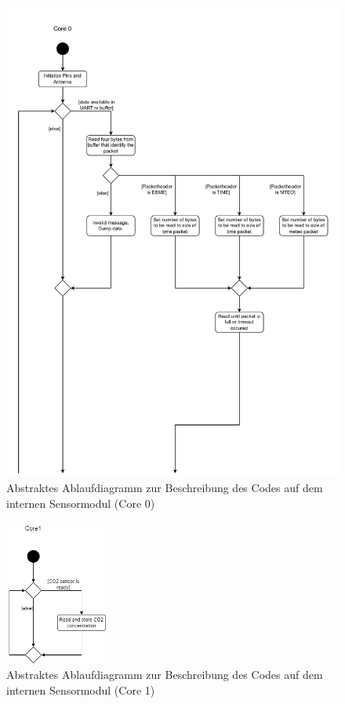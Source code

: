 \documentclass[a4paper,11pt]{article}
\begin{document}
\begin{figure}[H]
  \centering
  \includegraphics[scale=0.75, page=2]{Ablauf intern.pdf}
  \caption{Abstraktes Ablaufdiagramm zur Beschreibung des Codes auf dem internen Sensormodul (Core 0)}
  \label{pdf:ablaufIntern}
\end{figure}

\newpage
\begin{figure}[H]
  \centering
  \includegraphics[width=0.3\textwidth]{Ablauf intern Core1.png}
  \caption{Abstraktes Ablaufdiagramm zur Beschreibung des Codes auf dem internen Sensormodul (Core 1)}
  \label{pdf:ablaufInternCore1}
\end{figure}
\end{document}
